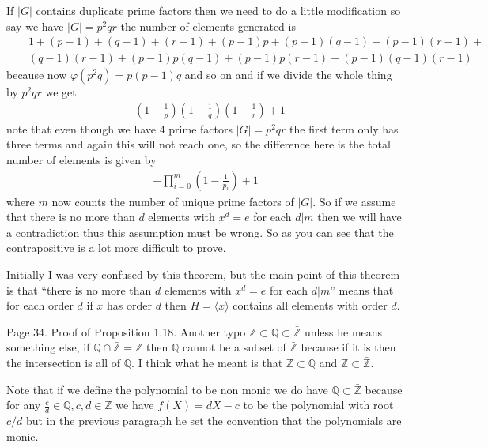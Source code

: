 \documentclass[aps,preprint,preprintnumbers,nofootinbib,showpacs,prd]{revtex4-1}
\newcommand{\nbea}{\begin{eqnarray*}}
\newcommand{\neea}{\end{eqnarray*}}
\begin{document}
If $|G|$ contains duplicate prime factors then we need to do a little modification so say we have $|G| = p^2qr$ the number of elements generated is 
%
\nbea
&&1 + (p - 1) + (q - 1) + (r - 1) + (p - 1)p  + (p - 1)(q - 1) + (p - 1)(r - 1) +  \\ 
&&(q - 1)(r - 1)  + (p - 1)p(q - 1) + (p - 1)p(r - 1) + (p - 1)(q - 1)(r - 1) 
\neea
%  
because now $\varphi(p^2 q) = p(p-1)q$ and so on and if we divide the whole thing by $p^2qr$ we get 
%
\nbea
-\left( 1 - \frac{1}{p} \right) \left( 1 - \frac{1}{q} \right) \left( 1 - \frac{1}{r} \right)  + 1   
\neea
% 
note that even though we have 4 prime factors $|G| = p^2 qr$ the first term only has three terms and again this will not reach one, so the difference here is the total number of elements is given by 
%
\nbea
-\prod_{i = 0}^m \left( 1 - \frac{1}{p_i} \right ) + 1
\neea
%
where $m$ now counts the number of unique prime factors of $|G|$. So if we assume that there is no more than $d$ elements with $x^d = e$ for each $d|m$ then we will have a contradiction thus this assumption must be wrong. So as you can see that the contrapositive is a lot more difficult to prove. 

Initially I was very confused by this theorem, but the main point of this theorem is that ``there is no more than $d$ elements with $x^d = e$ for each $d|m$'' means that for each order $d$ if $x$ has order $d$ then $H = \langle x \rangle$ contains all elements with order $d$. 





  
Page 34. Proof of Proposition 1.18. Another typo $\mathbb{Z} \subset \mathbb{Q} \subset \bar{\mathbb{Z}}$ unless he means something else, if $\mathbb{Q} \cap \bar{\mathbb{Z}} = \mathbb{Z}$ then $\mathbb{Q}$ cannot be a subset of $\bar{\mathbb{Z}}$ because if it is then the intersection is all of $\mathbb{Q}$. I think what he meant is that $\mathbb{Z} \subset \mathbb{Q}$ and $\mathbb{Z} \subset \bar{\mathbb{Z}}$. 

Note that if we define the polynomial to be non monic we do have $\mathbb{Q} \subset \bar{\mathbb{Z}}$ because for any $\frac{c}{d} \in \mathbb{Q}, c,d \in \mathbb{Z}$ we have $f(X) = dX - c$ to be the polynomial with root $c/d$ but in the previous paragraph he set the convention that the polynomials are monic. 
\end{document}
